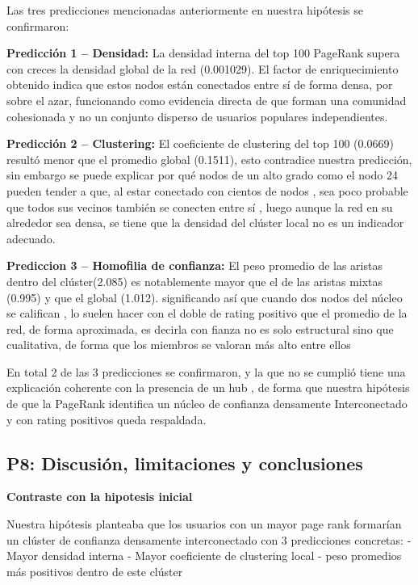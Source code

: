 \documentclass{article}
\begin{document}
Las tres predicciones mencionadas anteriormente en nuestra hipótesis se confirmaron:

\textbf{Predicción 1 -- Densidad:} La densidad interna del top 100 PageRank supera con creces la densidad global de la red (0.001029). El factor de enriquecimiento obtenido indica que estos nodos están conectados entre sí de forma densa, por sobre el azar, funcionando como evidencia directa de que forman una comunidad cohesionada y no un conjunto disperso de usuarios populares independientes.

\textbf{Predicción 2 -- Clustering:} El coeficiente de clustering del top 100 (0.0669) resultó menor que el promedio global (0.1511), esto contradice nuestra predicción, sin embargo se puede explicar por qué nodos de un alto grado como el nodo 24 pueden tender a que, al estar conectado con cientos de nodos , sea poco probable que todos sus vecinos también se conecten entre sí , luego aunque la red en su alrededor sea densa, se tiene que la densidad del clúster local no es un indicador adecuado.

\textbf{Prediccion 3 -- Homofilia de confianza:} El peso promedio de las aristas dentro del clúster(2.085) es notablemente mayor que el de las aristas mixtas (0.995) y que el global (1.012). significando así que cuando dos nodos del núcleo se califican , lo suelen hacer con el doble de rating positivo que el promedio de la red, de forma aproximada, es decirla con fianza no es solo estructural sino que cualitativa, de forma que los miembros se valoran más alto entre ellos

En total 2 de las 3 predicciones se confirmaron, y la que no se cumplió tiene una explicación coherente con la presencia de un hub , de forma que nuestra hipótesis de que la PageRank identifica un núcleo de confianza densamente Interconectado y con rating positivos queda respaldada.



\subsection*{P8: Discusión, limitaciones y conclusiones}

\textbf{Contraste con la hipotesis inicial}

Nuestra hipótesis planteaba que los usuarios con un mayor page rank formarían un clúster de confianza densamente interconectado con 3 predicciones concretas:
- Mayor densidad interna
- Mayor coeficiente de clustering local
- peso promedios más positivos dentro de este clúster
\end{document}
